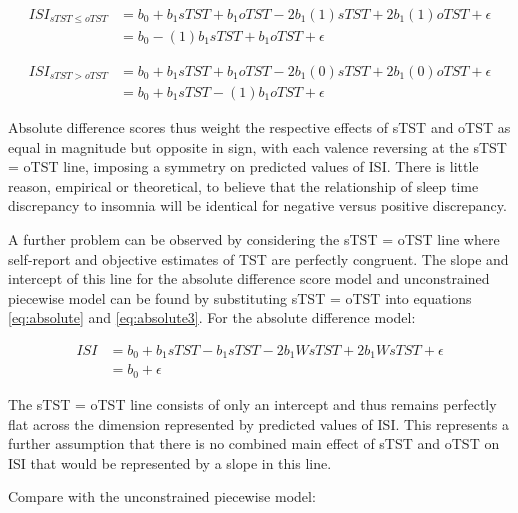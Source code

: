 \documentclass[
]{article}
\begin{document}
\begin{equation}
\begin{split}
ISI_{sTST \le oTST} & = b_{0} + b_{1}sTST + b_{1}oTST - 2b_{1}(1) sTST + 2b_{1}(1) oTST + \epsilon \\
& = b_{0} - (1)b_{1}sTST + b_{1}oTST + \epsilon
\end{split}
\label{eq:absolute4a}
\end{equation}

\begin{equation}
\begin{split}
ISI_{sTST > oTST} & = b_{0} + b_{1}sTST + b_{1}oTST - 2b_{1}(0) sTST + 2b_{1}(0) oTST + \epsilon \\
& = b_{0} + b_{1}sTST - (1)b_{1}oTST + \epsilon
\end{split}
\label{eq:absolute4b}
\end{equation}

Absolute difference scores thus weight the respective effects of sTST and oTST as equal in magnitude but opposite in sign, with each valence reversing at the sTST = oTST line, imposing a symmetry on predicted values of ISI. There is little reason, empirical or theoretical, to believe that the relationship of sleep time discrepancy to insomnia will be identical for negative versus positive discrepancy.

A further problem can be observed by considering the sTST = oTST line where self-report and objective estimates of TST are perfectly congruent. The slope and intercept of this line for the absolute difference score model and unconstrained piecewise model can be found by substituting sTST = oTST into equations \eqref{eq:absolute} and \eqref{eq:absolute3}. For the absolute difference model:

\begin{equation}
\begin{split}
ISI & = b_{0} + b_{1}sTST - b_{1}sTST - 2b_{1}W sTST + 2b_{1}W sTST + \epsilon \\
& = b_{0} + \epsilon
\end{split}
\label{eq:absolute5a}
\end{equation}

The sTST = oTST line consists of only an intercept and thus remains perfectly flat across the dimension represented by predicted values of ISI. This represents a further assumption that there is no combined main effect of sTST and oTST on ISI that would be represented by a slope in this line.

Compare with the unconstrained piecewise model:
\end{document}
